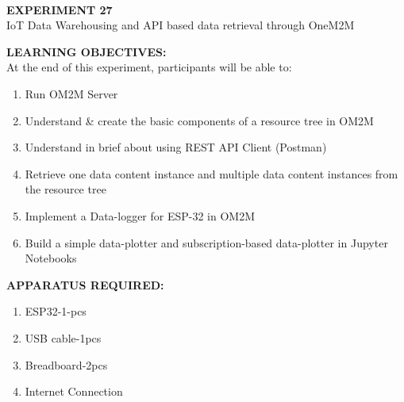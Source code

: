 \documentclass[12pt,a4paper]{article}
\begin{document}
\begin{center}
\textbf{\large \\EXPERIMENT 27 }\\[6pt]
IoT Data Warehousing and API based data retrieval through OneM2M
\end{center}

\textbf{\large LEARNING OBJECTIVES:}\\[3pt]
At the end of this experiment, participants will be able to:\vspace{-6mm}\begin{enumerate}
 \setlength\itemsep{-0.3em}
\item Run OM2M Server
\item Understand \& create the basic components of a resource tree in OM2M
\item Understand in brief about using REST API Client (Postman)
\item Retrieve one data content instance and multiple data content instances from the resource tree
\item Implement a Data-logger for ESP-32 in OM2M
\item Build a simple data-plotter and subscription-based data-plotter in Jupyter Notebooks
\end{enumerate}

\textbf{\large APPARATUS REQUIRED:}\\
\vspace{-3mm}
\begin{enumerate}
 \setlength\itemsep{-0.3em}
\item ESP32-1-pcs 
\item USB cable-1pcs
\item Breadboard-2pcs
\item Internet Connection 

\end{enumerate}
\end{document}
